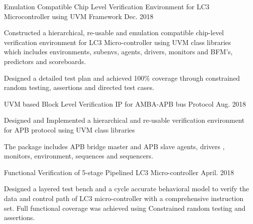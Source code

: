 \par\addvspace{1ex}
\begin{flushleft}
  \par\addvspace{-1.5mm}
  \fontsize{10.4pt}{1em}\selectfont{}
\end{flushleft}
\par\addvspace{-0.5ex}
\begin{cvprojects}
  \cvproject
    {Emulation Compatible Chip Level Verification Environment for LC3 Microcontroller using UVM Framework }
    {\color{darkgray}Dec. 2018}
    {
      \begin{cvprojectitems}
        \item {Constructed a hierarchical, re-usable and emulation compatible chip-level verification environment for LC3 Micro-controller using UVM class libraries which includes environments, subenvs, agents, drivers, monitors and BFM's, predictors and scoreboards.}
        \item {Designed a detailed test plan and achieved 100\% coverage through constrained random testing, assertions and directed test cases.}
      \end{cvprojectitems}
    }

  \cvproject
    {UVM based Block Level Verification IP for AMBA-APB bus Protocol} 
    {\color{darkgray}Aug. 2018}
    {
      \begin{cvprojectitems}
        \item {Designed and Implemented a hierarchical and re-usable verification environment for APB protocol using UVM class libraries}
        \item {The package includes APB bridge master and APB slave agents, drivers , monitors, environment, sequences and sequencers. }
      \end{cvprojectitems}
    }

    \cvproject
    {Functional Verification of 5-stage Pipelined LC3 Micro-controller} 
    {\color{darkgray}April. 2018}
    {
      \begin{cvprojectitems}
        \item {Designed a layered test bench and a cycle accurate behavioral model to verify the data and control path of LC3 micro-controller with a comprehensive instruction set. Full functional coverage was achieved using Constrained random testing and assertions.}
      \end{cvprojectitems}
    }


\end{cvprojects}
